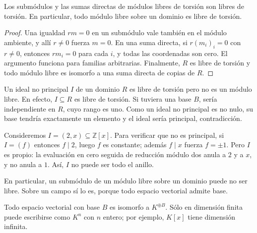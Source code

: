 \begin{lema}\label{lema:C20-libre-torsion}
Los submódulos y las sumas directas de módulos libres de torsión son libres de torsión. En particular, todo módulo libre sobre un dominio es libre de torsión.
\end{lema}
\begin{proof}
Una igualdad $rm=0$ en un submódulo vale también en el módulo ambiente, y allí $r\ne0$ fuerza $m=0$. En una suma directa, si $r(m_i)_i=0$ con $r\ne0$, entonces $rm_i=0$ para cada $i$, y todas las coordenadas son cero. El argumento funciona para familias arbitrarias. Finalmente, $R$ es libre de torsión y todo módulo libre es isomorfo a una suma directa de copias de $R$.
\end{proof}

\begin{ejem}\label{ejem:C20-ideal-no-libre}
Un ideal no principal $I$ de un dominio $R$ es libre de torsión pero no es un módulo libre. En efecto, $I\subseteq R$ es libre de torsión. Si tuviera una base $B$, sería independiente en $R$, cuyo rango es uno. Como un ideal no principal es no nulo, su base tendría exactamente un elemento y el ideal sería principal, contradicción.

Consideremos $I=(2,x)\subseteq\mathbb Z[x]$. Para verificar que no es principal, si $I=(f)$ entonces $f\mid2$, luego $f$ es constante; además $f\mid x$ fuerza $f=\pm1$. Pero $I$ es propio: la evaluación en cero seguida de reducción módulo dos anula a $2$ y a $x$, y no anula a $1$. Así, $I$ no puede ser todo el anillo.
\end{ejem}
En particular, un submódulo de un módulo libre sobre un dominio puede no ser libre. Sobre un campo sí lo es, porque todo espacio vectorial admite base.

\begin{obs}
Todo espacio vectorial con base $B$ es isomorfo a $K^{\oplus B}$. Sólo en dimensión finita puede escribirse como $K^n$ con $n$ entero; por ejemplo, $K[x]$ tiene dimensión infinita.
\end{obs}

